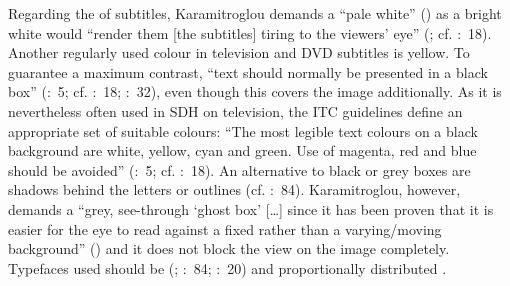 Regarding the  of subtitles, Karamitroglou demands a “pale white” (\citeyear{Karamitroglou1998}) as a bright white would “render them [the subtitles] tiring to the viewers’ eye” (\citealt{Karamitroglou1998}; cf. \citealt{Ford_williams2009}:~18). Another regularly used colour in television and DVD subtitles is yellow. To guarantee a maximum contrast, “text should normally be presented in a black box” (\citealt{Itc1999}:~5; cf. \citealt{Ford_williams2009}:~18; \citealt{Leisner2009}:~32), even though this covers the image additionally. As it is nevertheless often used in SDH on television, the ITC guidelines define an appropriate set of suitable colours: “The most legible text colours on a black background are white, yellow, cyan and green. Use of magenta, red and blue should be avoided” (\citealt{Itc1999}:~5; cf. \citealt{Ford_williams2009}:~18). An alternative to black or grey boxes are shadows behind the letters or outlines (cf. \citealt{Diaz_cintas2007b}:~84). Karamitroglou, however, demands a “grey, see-through ‘ghost box’ […] since it has been proven that it is easier for the eye to read against a fixed rather than a varying/moving background” (\citeyear{Karamitroglou1998}) and it does not block the view on the image completely. Typefaces used should be  (\citealt{Karamitroglou1998}; \citealt{Diaz_cintas2007b}:~84; \citealt{Ford_williams2009}:~20) and proportionally distributed \citep{Karamitroglou1998}.


